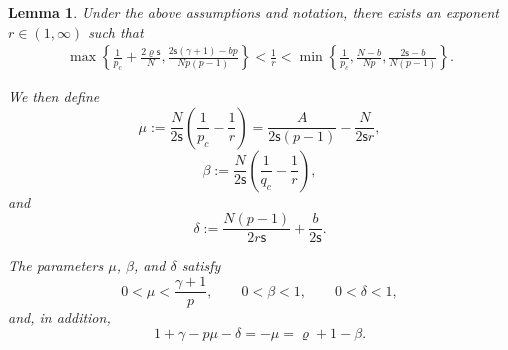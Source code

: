\documentclass[12pt,reqno]{amsart}
\theoremstyle{plain}
\newtheorem{lem}[thm]{Lemma}
\theoremstyle{definition}
\theoremstyle{remark}
\numberwithin{equation}{section}
\newcommand{\ts}{\mathsf{s}}
\begin{document}
\begin{lem}\label{Choice-r}
Under the above assumptions and notation, there exists an exponent
$r\in(1,\infty)$ such that
\begin{equation}\label{eq:range-r}
\begin{aligned}
\max\!\left\{
\frac{1}{p_{c}}+\frac{2\varrho\ts}{N},
\frac{2\ts(\gamma+1)-bp}{Np(p-1)}
\right\}
<
\frac{1}{r}
<
\min\!\left\{
\frac{1}{p_{c}},
\frac{N-b}{Np},
\frac{2\ts-b}{N(p-1)}
\right\}.
\end{aligned}
\end{equation}

We then define
\begin{equation}\label{mu-def}
\mu:=
\frac{N}{2\ts}\!\left(\frac{1}{p_{c}}-\frac{1}{r}\right)
=
\frac{A}{2\ts(p-1)}-\frac{N}{2\ts r},
\end{equation}
\begin{equation}\label{beta-def}
\beta:=
\frac{N}{2\ts}\!\left(\frac{1}{q_{c}}-\frac{1}{r}\right),
\end{equation}
and
\begin{equation}\label{delta-def}
\delta:=
\frac{N(p-1)}{2r\ts}+\frac{b}{2\ts}.
\end{equation}

The parameters $\mu$, $\beta$, and $\delta$ satisfy
\begin{equation}\label{Condition-intg}
0<\mu<\frac{\gamma+1}{p},
\qquad
0<\beta<1,
\qquad
0<\delta<1,
\end{equation}
and, in addition,
\begin{equation}\label{Algebric-expr}
1+\gamma-p\mu-\delta
=
-\mu
=
\varrho+1-\beta.
\end{equation}
\end{lem}
\end{document}
